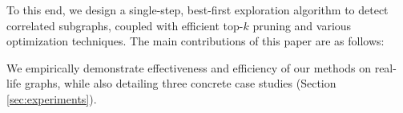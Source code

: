 {%

To this end, we design a single-step, best-first exploration algorithm to detect correlated subgraphs,
coupled with efficient top-$k$ pruning and various optimization techniques.
The main contributions of this paper are as follows:
\squishlist
\item
\item
\item
\item We empirically demonstrate effectiveness and efficiency of our methods on real-life graphs,
while also detailing three concrete case studies (Section \ref{sec:experiments}).
\squishend
}

